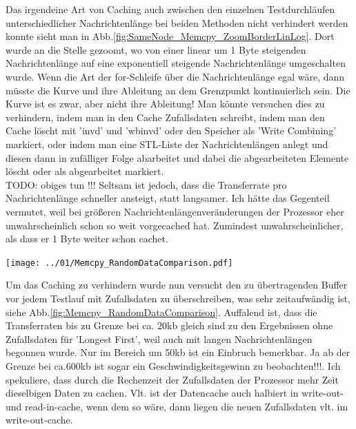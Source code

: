 \documentclass[12pt,a4paper]{article}
\begin{document}
\label{pg:memcpy-measmethod}
Das irgendeine Art von Caching auch zwischen den einzelnen Testdurchläufen unterschiedlicher Nachrichtenlänge bei beiden Methoden nicht verhindert werden konnte sieht man in Abb.\ref{fig:SameNode_Memcpy_ZoomBorderLinLog}. Dort wurde an die Stelle gezoomt, wo von einer linear um 1 Byte steigenden Nachrichtenlänge auf eine exponentiell steigende Nachrichtenlänge umgeschalten wurde. Wenn die Art der for-Schleife über die Nachrichtenlänge egal wäre, dann müsste die Kurve und ihre Ableitung an dem Grenzpunkt kontinuierlich sein. Die Kurve ist es zwar, aber nicht ihre Ableitung! 
Man könnte versuchen dies zu verhindern, indem man in den Cache Zufallsdaten schreibt, indem man den Cache löscht mit 'invd' und 'wbinvd' oder den Speicher als 'Write Combining' markiert, oder indem man eine STL-Liste der Nachrichtenlängen anlegt und diesen dann in zufälliger Folge abarbeitet und dabei die abgearbeiteten Elemente löscht oder als abgearbeitet markiert.\cite{socacheflush}\\
TODO: obiges tun !!!
Seltsam ist jedoch, dass die Transferrate pro Nachrichtenlänge schneller ansteigt, statt langsamer. Ich hätte das Gegenteil vermutet, weil bei größeren Nachrichtenlängenveränderungen der Prozessor eher unwahrscheinlich schon so weit vorgecached hat. Zumindest unwahrscheinlicher, als dass er 1 Byte weiter schon cachet.\\

\begin{center}
	\centering
	\captionsetup{type=figure}
	\begin{minipage}{\linewidth}
		\texttt{[image: ../01/Memcpy\_RandomDataComparison.pdf]}
	\end{minipage}
	\label{fig:Memcpy_RandomDataComparison}
\end{center}

Um das Caching zu verhindern wurde nun versucht den zu übertragenden Buffer vor jedem Testlauf mit Zufallsdaten zu überschreiben, was sehr zeitaufwändig ist, siehe Abb.\ref{fig:Memcpy_RandomDataComparison}. Auffalend ist, dass die Transferraten bis zu Grenze bei ca. 20kb gleich sind zu den Ergebnissen ohne Zufallsdaten für 'Longest First', weil auch mit langen Nachrichtenlängen begonnen wurde. Nur im Bereich um 50kb ist ein Einbruch bemerkbar. Ja ab der Grenze bei ca.600kb ist sogar ein Geschwindigkeitsgewinn zu beobachten!!!. Ich spekuliere, dass durch die Rechenzeit der Zufallsdaten der Prozessor mehr Zeit dieselbigen Daten zu cachen. Vlt. ist der Datencache auch halbiert in write-out- und read-in-cache, wenn dem so wäre, dann liegen die neuen Zufallsdaten vlt. im write-out-cache.\\
\end{document}
